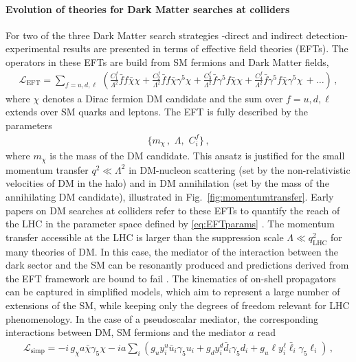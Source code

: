 \documentclass[12pt]{article}
\renewcommand\({\left(}
\renewcommand\){\right)}
\renewcommand\[{\left[}
\renewcommand\]{\right]}
\begin{document}
\paragraph{Evolution of theories for Dark Matter searches at colliders} For two of the three Dark Matter search strategies -direct and indirect detection- experimental results are presented in terms of effective field theories (EFTs). The operators in these EFTs are build from SM fermions and Dark Matter fields, 
\begin{align}\label{eq:EFT}
\mathcal{L}_\text{EFT}= \sum_{f=u, d, \ell} \,\left(\frac{C_{1}^f}{\Lambda^2} \bar f f \bar \chi \chi+ \frac{C^f_{2}}{\Lambda^2}\bar  f f \bar \chi \gamma^5\chi +\frac{C_{3}^f }{\Lambda^2}\bar  f \gamma^5 f \bar \chi \chi +\frac{C_{4}^f}{\Lambda^2} \bar  f \gamma^5 f \bar \chi\gamma^5 \chi \,+\ldots \right) \,,
\end{align}
where $\chi$ denotes a Dirac fermion DM candidate and the sum over $f=u,d,\ell$ extends over SM quarks and leptons. The EFT is fully described by the parameters 
\begin{align}\label{eq:EFTparams}
\big\{ m_\chi\,,\,\,\Lambda ,\,\, C_i^f\big\} \,,
\end{align}
where $m_\chi$ is the mass of the DM candidate.
This ansatz is justified for the small momentum transfer $q^2\ll \Lambda^2$ in DM-nucleon scattering (set by the non-relativistic velocities of DM in the halo) and in DM annihilation (set by the mass of the annihilating DM candidate), illustrated in Fig.~\ref{fig:momentumtransfer}. Early papers on DM searches at colliders refer to these EFTs to quantify the reach of the LHC in the parameter space defined by \eqref{eq:EFTparams}  \cite{Beltran:2010ww, Fox:2011pm,Goodman:2010ku}. The momentum transfer accessible at the LHC is larger than the suppression scale $\Lambda \ll q^2_\text{LHC}$ for many theories of DM. 
In this case, the mediator of the interaction between the dark sector and the SM can be resonantly produced and predictions derived from the EFT framework are bound to fail \cite{}. The kinematics   
of on-shell propagators can be captured in simplified models, which aim to represent a large number of extensions of the SM, while keeping only the degrees of freedom relevant for LHC phenomenology. In the case of a pseudoscalar mediator, the corresponding interactions between DM, SM fermions and the mediator $a$ read
\begin{align}\label{eq:simp}
\mathcal{L}_\text{simp}=-i\,g_\chi a\bar \chi \gamma_5 \chi -i a \sum_i \left(g_u y_i^u \bar u_i \gamma_5 u_i + g_d y_i^d \bar d_i \gamma_5 d_i + g_u\ell y_i^\ell \bar \ell_i \gamma_5 \ell_i  \right) \,,
\end{align}
\end{document}
